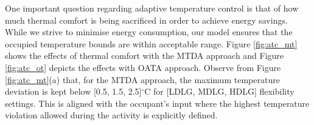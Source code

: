 

One important question regarding adaptive temperature control is that of how much thermal comfort is being sacrificed in order to achieve energy savings. While we strive to minimise energy consumption, our model ensures that the occupied temperature bounds are within acceptable range. 
Figure \ref{fig:atc_mt} shows the effects of thermal comfort with the MTDA approach and Figure \ref{fig:atc_ot} depicts the effects with OATA approach. Observe from Figure \ref{fig:atc_mt}(a) that, for the MTDA approach, the maximum temperature deviation is kept below [0.5, 1.5, 2.5]$^\circ$C for [LDLG, MDLG, HDLG] flexibility settings. This is aligned with the occupant's input where the highest temperature violation allowed during the activity is explicitly defined. 

